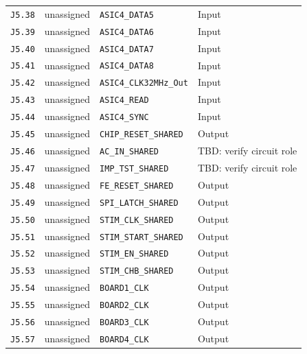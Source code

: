 \documentclass[11pt,a4paper]{article}
\begin{document}
\begin{longtable}{@{}P{19mm}P{36mm}P{78mm}P{33mm}@{}}
\nolinkurl{J5.38} & \textcolor{muted}{unassigned} & \nolinkurl{ASIC4_DATA5} & Input \\
\nolinkurl{J5.39} & \textcolor{muted}{unassigned} & \nolinkurl{ASIC4_DATA6} & Input \\
\nolinkurl{J5.40} & \textcolor{muted}{unassigned} & \nolinkurl{ASIC4_DATA7} & Input \\
\nolinkurl{J5.41} & \textcolor{muted}{unassigned} & \nolinkurl{ASIC4_DATA8} & Input \\
\nolinkurl{J5.42} & \textcolor{muted}{unassigned} & \nolinkurl{ASIC4_CLK32MHz_Out} & Input \\
\nolinkurl{J5.43} & \textcolor{muted}{unassigned} & \nolinkurl{ASIC4_READ} & Input \\
\nolinkurl{J5.44} & \textcolor{muted}{unassigned} & \nolinkurl{ASIC4_SYNC} & Input \\
\nolinkurl{J5.45} & \textcolor{muted}{unassigned} & \nolinkurl{CHIP_RESET_SHARED} & Output \\
\nolinkurl{J5.46} & \textcolor{muted}{unassigned} & \nolinkurl{AC_IN_SHARED} & TBD: verify circuit role \\
\nolinkurl{J5.47} & \textcolor{muted}{unassigned} & \nolinkurl{IMP_TST_SHARED} & TBD: verify circuit role \\
\nolinkurl{J5.48} & \textcolor{muted}{unassigned} & \nolinkurl{FE_RESET_SHARED} & Output \\
\nolinkurl{J5.49} & \textcolor{muted}{unassigned} & \nolinkurl{SPI_LATCH_SHARED} & Output \\
\nolinkurl{J5.50} & \textcolor{muted}{unassigned} & \nolinkurl{STIM_CLK_SHARED} & Output \\
\nolinkurl{J5.51} & \textcolor{muted}{unassigned} & \nolinkurl{STIM_START_SHARED} & Output \\
\nolinkurl{J5.52} & \textcolor{muted}{unassigned} & \nolinkurl{STIM_EN_SHARED} & Output \\
\nolinkurl{J5.53} & \textcolor{muted}{unassigned} & \nolinkurl{STIM_CHB_SHARED} & Output \\
\nolinkurl{J5.54} & \textcolor{muted}{unassigned} & \nolinkurl{BOARD1_CLK} & Output \\
\nolinkurl{J5.55} & \textcolor{muted}{unassigned} & \nolinkurl{BOARD2_CLK} & Output \\
\nolinkurl{J5.56} & \textcolor{muted}{unassigned} & \nolinkurl{BOARD3_CLK} & Output \\
\nolinkurl{J5.57} & \textcolor{muted}{unassigned} & \nolinkurl{BOARD4_CLK} & Output \\

\end{longtable}
\end{document}
